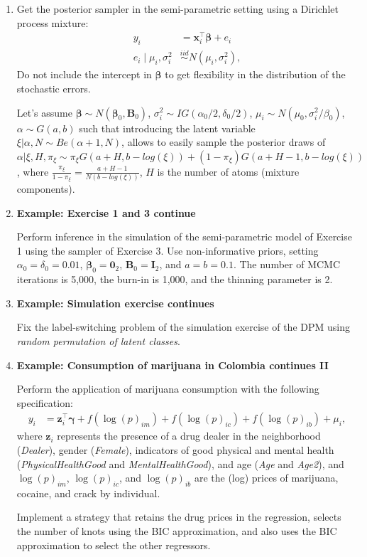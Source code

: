 \begin{enumerate}
	\item Get the posterior sampler in the semi-parametric setting using a Dirichlet process mixture:
	\begin{align*}
		y_i&=\boldsymbol{x}_i^{\top}\boldsymbol{\beta}+e_i\\
		e_i\mid \mu_i,\sigma_i^2 &\stackrel{iid}{\sim} N(\mu_i,\sigma_i^2),
	\end{align*}
	Do not include the intercept in $\boldsymbol{\beta}$ to get flexibility in the distribution of the stochastic errors.
	
	Let's assume $\boldsymbol{\beta}\sim N(\boldsymbol{\beta}_0,\boldsymbol{B}_0)$, $\sigma_i^2\sim IG(\alpha_0/2,\delta_0/2)$, $\mu_i\sim N(\mu_0,\sigma_i^2/\beta_0)$, $\alpha\sim G(a,b)$ such that introducing the latent variable $\xi|\alpha,N\sim Be(\alpha+1,N)$, allows to easily sample the posterior draws of  $\alpha|\xi,H,\pi_{\xi}\sim\pi_{\xi}{G}(a+H,b-log(\xi))+(1-\pi_{\xi}){G}(a+H-1,b-log(\xi))$, where $\frac{\pi_{\xi}}{1-\pi_{\xi}}=\frac{a+H-1}{N(b-log(\xi))}$, $H$ is the number of atoms (mixture components). 
	
	\item  \textbf{Example: Exercise 1 and 3 continue}
	
	Perform inference in the simulation of the semi-parametric model of Exercise 1 using the sampler of Exercise 3. Use non-informative priors, setting $\alpha_{0}=\delta_{0}=0.01$, $\boldsymbol{\beta}_{0}=\boldsymbol{0}_2$, $\boldsymbol{B}_{0}=\boldsymbol{I}_2$, and $a=b=0.1$. The number of MCMC iterations is 5,000, the burn-in is 1,000, and the thinning parameter is 2. 
	
	\item \textbf{Example: Simulation exercise continues}
	
	Fix the label-switching problem of the simulation exercise of the DPM using \textit{random permutation of latent classes}.
	
	\item \textbf{Example: Consumption of marijuana in Colombia continues II}
	
	Perform the application of marijuana consumption with the following specification:
	\begin{align*}
		y_i & = \boldsymbol{z}_i^{\top} \boldsymbol{\gamma} + f(\log(p)_{im}) + f(\log(p)_{ic}) + f(\log(p)_{ib}) + \mu_i,
	\end{align*}
	where $\boldsymbol{z}_i$ represents the presence of a drug dealer in the neighborhood (\textit{Dealer}), gender (\textit{Female}), indicators of good physical and mental health (\textit{PhysicalHealthGood} and \textit{MentalHealthGood}), and age (\textit{Age} and \textit{Age2}), and $\log(p)_{im}$, $\log(p)_{ic}$, and $\log(p)_{ib}$ are the (log) prices of marijuana, cocaine, and crack by individual.
	
	Implement a strategy that retains the drug prices in the regression, selects the number of knots using the BIC approximation, and also uses the BIC approximation to select the other regressors.
	
  
\end{enumerate}

